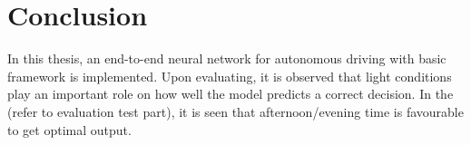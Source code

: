 \chapter{Conclusion}

In this thesis, an end-to-end neural network for autonomous driving with basic framework
is implemented. Upon evaluating, it is observed that light conditions play an important
role on how well the model predicts a correct decision. In the (refer to evaluation test
part), it is seen that afternoon/evening time is favourable to get optimal output.
